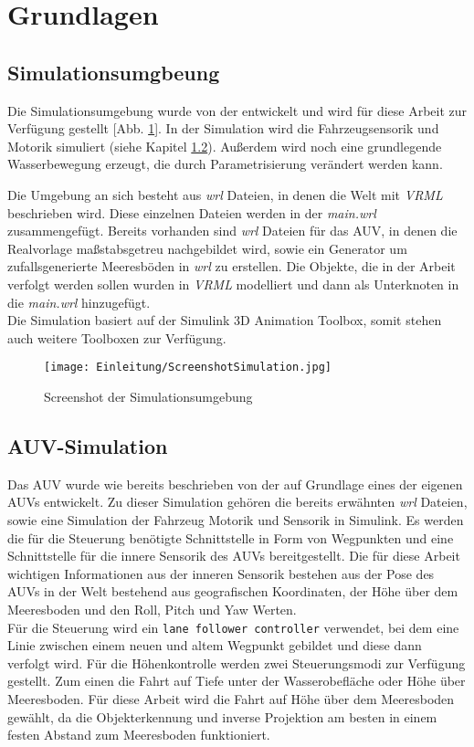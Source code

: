 \section{Grundlagen}
\subsection{Simulationsumgbeung}
Die Simulationsumgebung wurde von der \atlas entwickelt und wird für diese Arbeit zur Verfügung gestellt [Abb. \ref{screenSim}].
In der Simulation wird die Fahrzeugsensorik und Motorik simuliert (siehe Kapitel \ref{sec_auvSimGrundlage}). Außerdem wird noch eine grundlegende Wasserbewegung erzeugt, die durch Parametrisierung verändert werden kann.\\

Die Umgebung an sich besteht aus \textit{wrl} Dateien, in denen die Welt mit \textit{VRML} beschrieben wird. Diese einzelnen Dateien werden in der \textit{main.wrl} zusammengefügt. Bereits vorhanden sind \textit{wrl} Dateien für das AUV, in denen die Realvorlage maßstabsgetreu nachgebildet wird, sowie ein Generator um zufallsgenerierte Meeresböden in \textit{wrl} zu erstellen. Die Objekte, die in der Arbeit verfolgt werden sollen wurden in \textit{VRML} modelliert und dann als Unterknoten in die \textit{main.wrl} hinzugefügt.\\
Die Simulation basiert auf der \matlab Simulink 3D Animation Toolbox, somit stehen auch weitere \matlab Toolboxen zur Verfügung. 
\begin{figure}[H]
\texttt{[image: Einleitung/ScreenshotSimulation.jpg]}
\caption{Screenshot der Simulationsumgebung}
\label{screenSim}
\end{figure}
\subsection{AUV-Simulation}
\label{sec_auvSimGrundlage}
Das AUV wurde wie bereits beschrieben von der \atlas auf Grundlage eines der eigenen AUVs entwickelt. Zu dieser Simulation gehören die bereits erwähnten \textit{wrl} Dateien, sowie eine Simulation der Fahrzeug Motorik und Sensorik in \matlab Simulink. Es werden die für die Steuerung benötigte Schnittstelle in Form von Wegpunkten und eine Schnittstelle für die innere Sensorik des AUVs bereitgestellt. Die für diese Arbeit wichtigen Informationen aus der inneren Sensorik bestehen aus der Pose des AUVs in der Welt bestehend aus geografischen Koordinaten, der Höhe über dem Meeresboden und den Roll, Pitch und Yaw Werten.\\
Für die Steuerung wird ein \texttt{lane follower controller} verwendet, bei dem eine Linie zwischen einem neuen und altem Wegpunkt gebildet und diese dann verfolgt wird. Für die Höhenkontrolle werden zwei Steuerungsmodi zur Verfügung gestellt. Zum einen die Fahrt auf Tiefe unter der Wasserobefläche oder Höhe über Meeresboden. Für diese Arbeit wird die Fahrt auf Höhe über dem Meeresboden gewählt, da die Objekterkennung und inverse Projektion am besten in einem festen Abstand zum Meeresboden funktioniert.


